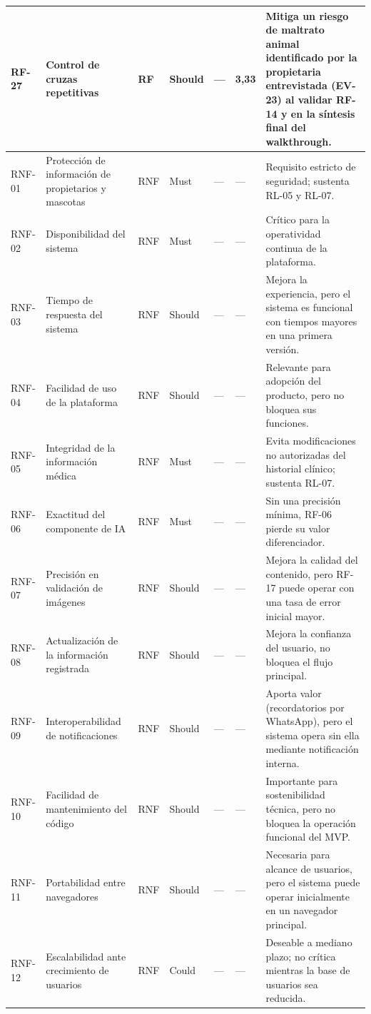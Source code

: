 \documentclass[journal,onecolumn]{IEEEtran}
\begin{document}
\begin{landscape}
\begin{longtable}{@{}p{1.2cm} p{5.2cm} p{1.0cm} p{1.3cm} p{1.3cm} p{1.1cm} p{6.5cm}@{}}
			RF-27 & Control de cruzas repetitivas & RF & Should & --- & 3,33 & Mitiga un riesgo de maltrato animal identificado por la propietaria entrevistada (EV-23) al validar RF-14 y en la síntesis final del walkthrough. \\ \midrule
			RNF-01 & Protección de información de propietarios y mascotas & RNF & Must & --- & --- & Requisito estricto de seguridad; sustenta RL-05 y RL-07. \\ \midrule
			RNF-02 & Disponibilidad del sistema & RNF & Must & --- & --- & Crítico para la operatividad continua de la plataforma. \\ \midrule
			RNF-03 & Tiempo de respuesta del sistema & RNF & Should & --- & --- & Mejora la experiencia, pero el sistema es funcional con tiempos mayores en una primera versión. \\ \midrule
			RNF-04 & Facilidad de uso de la plataforma & RNF & Should & --- & --- & Relevante para adopción del producto, pero no bloquea sus funciones. \\ \midrule
			RNF-05 & Integridad de la información médica & RNF & Must & --- & --- & Evita modificaciones no autorizadas del historial clínico; sustenta RL-07. \\ \midrule
			RNF-06 & Exactitud del componente de IA & RNF & Must & --- & --- & Sin una precisión mínima, RF-06 pierde su valor diferenciador. \\ \midrule
			RNF-07 & Precisión en validación de imágenes & RNF & Should & --- & --- & Mejora la calidad del contenido, pero RF-17 puede operar con una tasa de error inicial mayor. \\ \midrule
			RNF-08 & Actualización de la información registrada & RNF & Should & --- & --- & Mejora la confianza del usuario, no bloquea el flujo principal. \\ \midrule
			RNF-09 & Interoperabilidad de notificaciones & RNF & Should & --- & --- & Aporta valor (recordatorios por WhatsApp), pero el sistema opera sin ella mediante notificación interna. \\ \midrule
			RNF-10 & Facilidad de mantenimiento del código & RNF & Should & --- & --- & Importante para sostenibilidad técnica, pero no bloquea la operación funcional del MVP. \\ \midrule
			RNF-11 & Portabilidad entre navegadores & RNF & Should & --- & --- & Necesaria para alcance de usuarios, pero el sistema puede operar inicialmente en un navegador principal. \\ \midrule
			RNF-12 & Escalabilidad ante crecimiento de usuarios & RNF & Could & --- & --- & Deseable a mediano plazo; no crítica mientras la base de usuarios sea reducida. \\ \midrule

\end{longtable}
\end{landscape}
\end{document}
